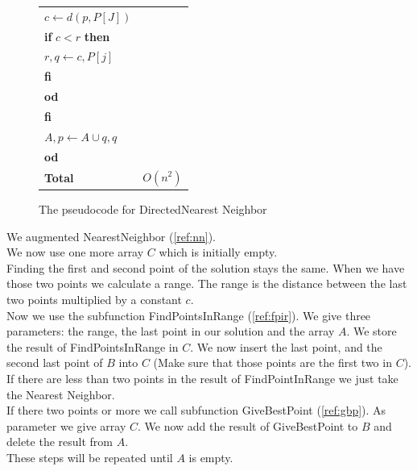 \begin{figure}
\begin{tabular}{lr}
        \qquad \qquad \qquad $c \gets d(p,P[J])$                            & \\
        \qquad \qquad \qquad \textbf{if} $c < r$ \textbf{then}              & \\
        \qquad \qquad \qquad \qquad  $r,q \gets c, P[j]$                    & \\
        \qquad \qquad \qquad \textbf{fi}                                    & \\
        \qquad \qquad \textbf{od}                                           & \\
        \qquad \textbf{fi}                                                  & \\
        \qquad $A,p \gets A \cup {q},q$                                     & \\
       \textbf{od}                                                          & \\ \hline
        \qquad \qquad \qquad\qquad\qquad\qquad\qquad \textbf{Total }        & $O(n^{2})$ 
        \end{tabular}
        
        \label{fig:dnncode}
        \caption{The pseudocode for DirectedNearest Neighbor}
      \end{figure}
      
      We augmented NearestNeighbor (\ref{ref:nn}).\\
      We now use one more array $C$ which is initially empty.\\
      Finding the first and second point of the solution stays the same. When we have those two points we calculate a range. The range is the distance between the last two points multiplied by a constant $c$.\\
      Now we use the subfunction FindPointsInRange (\ref{ref:fpir}). We give three parameters: the range, the last point in our solution and the array $A$. We store the result of FindPointsInRange in $C$. We now insert the last point, and the second last point of $B$ into $C$ (Make sure that those points are the first two in $C$).\\
      If there are less than two points in the result of FindPointInRange we just take the Nearest Neighbor.\\
      If there two points or more we call subfunction GiveBestPoint (\ref{ref:gbp}). As parameter we give array $C$. We now add the result of GiveBestPoint to $B$ and delete the result from $A$.\\
      These steps will be repeated until $A$ is empty.

